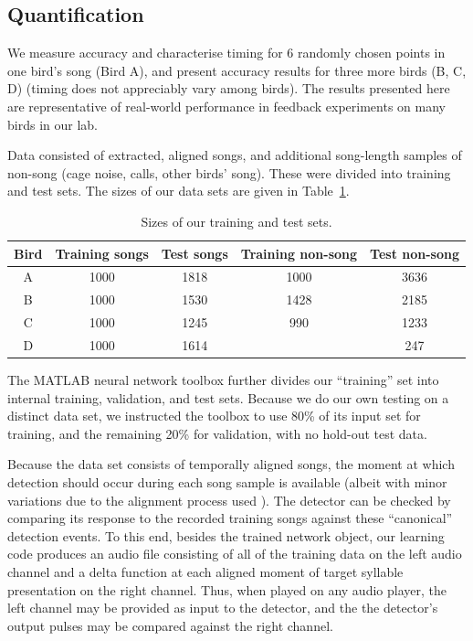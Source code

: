 \documentclass[10pt,letterpaper]{article}
\begin{document}
\subsection{Quantification}
\label{sec:quantify}

We measure accuracy and characterise timing for 6 randomly chosen
points in one bird's song (Bird A), and present accuracy results for
three more birds (B, C, D) (timing does not appreciably vary among
birds). The results presented here are representative of real-world
performance in feedback experiments on many birds in our lab.


Data consisted of extracted, aligned songs, and additional song-length samples of non-song (cage noise, calls, other birds' song). These were divided into training and test sets. The sizes of our data sets are given in Table~\ref{table:datasizes}.

\begin{table}
  \begin{tabular}{c|cccc}
    Bird & Training songs & Test songs & Training non-song & Test non-song \\ \hline
    A & 1000 & 1818 & 1000 & 3636 \\
    B & 1000 & 1530 & 1428 & 2185 \\
    C & 1000 & 1245 & 990 & 1233 \\
    D & 1000 & 1614 &  & 247
  \end{tabular}
  \caption{Sizes of our training and test sets.}
  \label{table:datasizes}
\end{table}

The MATLAB neural network toolbox further divides our ``training'' set
into internal training, validation, and test sets.  Because we do our
own testing on a distinct data set, we instructed the
toolbox to use 80\% of its input set for training, and the
remaining 20\% for validation, with no hold-out test data.

Because the data set consists of temporally aligned songs, the moment
at which detection should occur during each song sample is available
(albeit with minor variations due to the alignment process used
\cite{Poole2012}).  The detector can be checked by comparing its
response to the recorded training songs against these
``canonical'' detection events.  To this end, besides the trained
network object, our learning code produces an audio file consisting of
all of the training data on the left audio channel and a delta
function at each aligned moment of target syllable presentation on the
right channel. Thus, when played on any audio player, the left channel
may be provided as input to the detector, and the the detector's
output pulses may be compared against the right channel.
\end{document}
